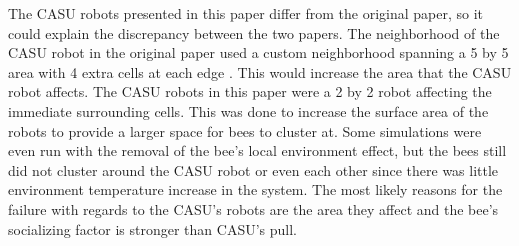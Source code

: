 \documentclass[conference,compsoc,onecolumn]{IEEEtran}
\begin{document}
The CASU robots presented in this paper differ from the original paper, so it could explain the discrepancy between the two papers. The neighborhood of the CASU robot in the original paper used a custom neighborhood spanning a 5 by 5 area with 4 extra cells at each edge \cite{Stefanc2017}. This would increase the area that the CASU robot affects. The CASU robots in this paper were a 2 by 2 robot affecting the immediate surrounding cells. This was done to increase the surface area of the robots to provide a larger space for bees to cluster at. Some simulations were even run with the removal of the bee's local environment effect, but the bees still did not cluster around the CASU robot or even each other since there was little environment temperature increase in the system. The most likely reasons for the failure with regards to the CASU's robots are the area they affect and the bee's socializing factor is stronger than CASU's pull.
\end{document}
